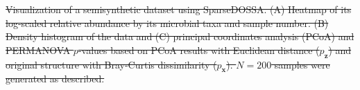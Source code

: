 \documentclass[11pt]{article}
\newcommand{\1}{{\rm 1}\kern-0.24em{\rm I}}
\providecommand{\DIFdeltex}[1]{{\protect\color{red}\sout{#1}}}                      %
\providecommand{\DIFdelbegin}{} %
\providecommand{\DIFdelend}{} %
\providecommand{\DIFdelFL}[1]{\DIFdel{#1}} %
\providecommand{\DIFdel}[1]{\texorpdfstring{\DIFdeltex{#1}}{}} %
\newcommand{\DIFscaledelfig}{0.5}
\newlength{\DIFdelgraphicswidth} %
\newlength{\DIFdelgraphicsheight} %
\newcommand{\DIFdelincludegraphics}[2][]{%
\sbox{\DIFdelgraphicsbox}{\DIFOincludegraphics[#1]{#2}}%
\settoboxwidth{\DIFdelgraphicswidth}{\DIFdelgraphicsbox} %
\settoboxtotalheight{\DIFdelgraphicsheight}{\DIFdelgraphicsbox} %
\scalebox{\DIFscaledelfig}{%
\parbox[b]{\DIFdelgraphicswidth}{\usebox{\DIFdelgraphicsbox}\\[-\baselineskip] \rule{\DIFdelgraphicswidth}{0em}}\llap{\resizebox{\DIFdelgraphicswidth}{\DIFdelgraphicsheight}{%
\setlength{\unitlength}{\DIFdelgraphicswidth}%
\begin{picture}(1,1)%
\thicklines\linethickness{2pt} %
{\color[rgb]{1,0,0}\put(0,0){\framebox(1,1){}}}%
{\color[rgb]{1,0,0}\put(0,0){\line( 1,1){1}}}%
{\color[rgb]{1,0,0}\put(0,1){\line(1,-1){1}}}%
\end{picture}%
}\hspace*{3pt}}} %
} %
\DeclareRobustCommand{\DIFdelbegin}{\DIFOdelbegin \let\includegraphics\DIFdelincludegraphics} %
\DeclareRobustCommand{\DIFdelend}{\DIFOaddend \let\includegraphics\DIFOincludegraphics} %
\begin{document}
\DIFdelbegin %
{%
\DIFdelFL{Visualization of a semisynthetic dataset using SparseDOSSA. (A) Heatmap of its log-scaled relative abundance by its microbial taxa and sample number. (B) Density histogram of the data and (C) principal coordinates analysis (PCoA) and PERMANOVA $p$-values based on PCoA results with Euclidean distance ($p_\mathbf{z}$) and original structure with Bray-Curtis dissimilarity ($p_\mathbf{x}$). $N=200$ samples were generated as described.}}
\DIFdelend %
\end{document}

